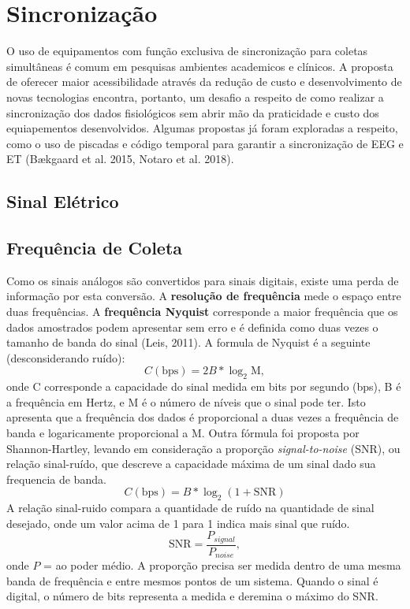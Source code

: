 \chapter{Sincronização}

O uso de equipamentos com função exclusiva de sincronização para coletas simultâneas é comum em pesquisas ambientes academicos e clínicos.
A proposta de oferecer maior acessibilidade através da redução de custo e desenvolvimento de novas tecnologias encontra, portanto, um desafio a respeito 
de como realizar a sincronização dos dados fisiológicos sem abrir mão da praticidade e custo dos equiapementos desenvolvidos. 
Algumas propostas já foram exploradas a respeito, como o uso de piscadas e código temporal para garantir a sincronização de EEG e ET (Bækgaard et al. 2015, Notaro et al. 2018).

\section{Sinal Elétrico}



\section{Frequência de Coleta}
Como os sinais análogos são convertidos para sinais digitais, existe uma perda de informação por esta conversão. 
A \textbf{resolução de frequência} mede o espaço entre duas frequências. A \textbf{frequência Nyquist} corresponde a maior frequência que os dados amostrados podem apresentar
sem erro e é definida como duas vezes o tamanho de banda do sinal (Leis, 2011). A formula de Nyquist é a seguinte
(desconsiderando ruído):
\begin{equation}
    C(\text{bps}) = 2B * \log_2 \text{M},
\end{equation}
onde C corresponde a capacidade do sinal medida em bits por segundo (bps), B é a frequência em Hertz, e M é o 
número de níveis que o sinal pode ter. 
Isto apresenta que a frequência dos dados é proporcional a duas vezes a
 frequência de banda e logaricamente proporcional a M. 
Outra fórmula foi proposta por Shannon-Hartley, levando em consideração a proporção 
\textit{signal-to-noise} (SNR), ou relação sinal-ruído, que descreve a capacidade máxima de um sinal dado sua frequencia 
de banda. 
\begin{equation}
    C(\text{bps}) = B * \log_2 (1 + \text{SNR})
\end{equation}
A relação sinal-ruido compara a quantidade de ruído na quantidade de sinal desejado, onde um valor acima de 1 para 1
indica mais sinal que ruído. 
\begin{equation}
    \text{SNR} = \frac {P_{signal}}{P_{noise}},
\end{equation}
onde $P$ = ao poder médio. A proporção precisa ser medida dentro de uma mesma banda de frequência 
e entre mesmos pontos de um sistema. Quando o sinal é digital, o número de bits representa 
a medida e deremina o máximo do SNR. 

